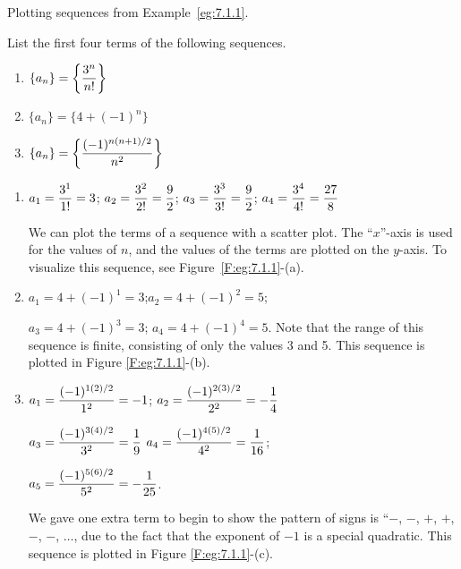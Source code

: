 \begin{marginfigure}[4cm] %


\caption{Plotting sequences from Example~\ref{eg:7.1.1}.} \label{F:eg:7.1.1}
\end{marginfigure}

\begin{example} \label{eg:7.1.1} %
List the first four terms of the following sequences.

\begin{enumerate}[1), leftmargin=*]
\item $\displaystyle \{a_n\} = \left\{\frac{3^n}{n!}\right\}$
\item $\{a_n\} = \{4+(-1)^n\}$
\item $\displaystyle \{a_n\} = \left\{\frac{(-1)^{n(n+1)/2}}{n^2}\right\}$
\end{enumerate}

\solution
\begin{enumerate}[1)]
\item	 $\displaystyle a_1=\frac{3^1}{1!} = 3$; $\displaystyle a_2= \frac{3^2}{2!} = \frac92$; $\displaystyle a_3 = \frac{3^3}{3!} = \frac92$; $\displaystyle a_4 = \frac{3^4}{4!} = \frac{27}8$

We can plot the terms of a sequence with a scatter plot. The ``$x$''-axis is used for the values of $n$, and the values of the terms are plotted on the $y$-axis. To visualize this sequence, see Figure~\ref{F:eg:7.1.1}-(a).\\

\item		$a_1= 4+(-1)^1 = 3$;\qquad $a_2 = 4+(-1)^2 = 5$; 

\noindent $a_3=4+(-1)^3 = 3$; \qquad $a_4 = 4+(-1)^4 = 5$. Note that the range of this sequence is finite, consisting of only the values 3 and 5. This sequence is plotted in Figure \ref{F:eg:7.1.1}-(b).\\

\item		$\displaystyle a_1= \frac{(-1)^{1(2)/2}}{1^2} = -1$; \qquad $\displaystyle a_2 = \frac{(-1)^{2(3)/2}}{2^2} =-\frac14$

\noindent $\displaystyle a_3 = \frac{(-1)^{3(4)/2}}{3^2} = \frac19$ \qquad $\displaystyle a_4 = \frac{(-1)^{4(5)/2}}{4^2} = \frac1{16}$; 

\noindent $\displaystyle a_5 = \frac{(-1)^{5(6)/2}}{5^2}=-\frac1{25}$.

\noindent We gave one extra term to begin to show the pattern of signs is ``$-$, $-$, $+$, $+$, $-$, $-$, $\ldots$, due to the fact that the exponent of $-1$ is a special quadratic. This sequence is plotted in Figure \ref{F:eg:7.1.1}-(c).
\end{enumerate}
\end{example}